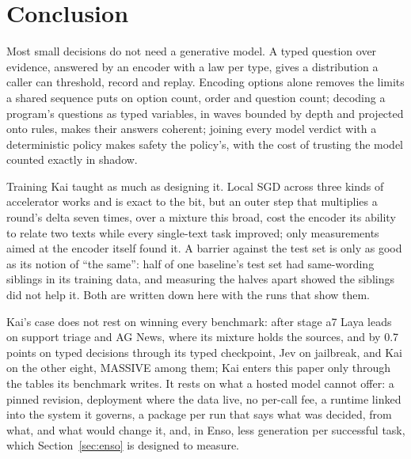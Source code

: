 \section{Conclusion}
\label{sec:conclusion}

Most small decisions do not need a generative model. A typed question over
evidence, answered by an encoder with a law per type, gives a distribution a
caller can threshold, record and replay. Encoding options alone removes the
limits a shared sequence puts on option count, order and question count;
decoding a program's questions as typed variables, in waves bounded by depth
and projected onto rules, makes their answers coherent; joining every model
verdict with a deterministic policy makes safety the policy's, with the cost of
trusting the model counted exactly in shadow.

Training Kai taught as much as designing it. Local SGD across three kinds of
accelerator works and is exact to the bit, but an outer step that multiplies a
round's delta seven times, over a mixture this broad, cost the encoder its
ability to relate two texts while every single-text task improved; only
measurements aimed at the encoder itself found it. A barrier against the test
set is only as good as its notion of ``the same'': half of one baseline's test
set had same-wording siblings in its training data, and measuring the halves
apart showed the siblings did not help it. Both are written down here with the
runs that show them.

Kai's case does not rest on winning every benchmark: after stage a7 Laya leads
on support triage and AG News, where its mixture holds the sources, and by 0.7
points on typed decisions through its typed checkpoint, Jev on jailbreak, and
Kai on the other eight, MASSIVE among them; Kai enters this
paper only through the tables its benchmark writes. It rests on what a hosted model cannot offer:
a pinned revision, deployment where the data live, no per-call fee, a runtime
linked into the system it governs, a package per run that says what was
decided, from what, and what would change it, and, in Enso, less generation per
successful task, which Section~\ref{sec:enso} is designed to measure.
